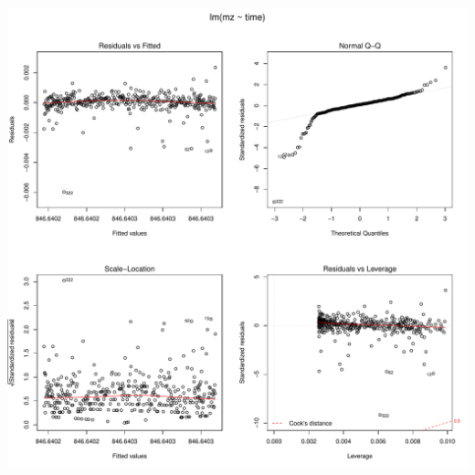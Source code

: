 \documentclass[]{article}
\begin{document}
\includegraphics{Supplementary_document_files/figure-latex/fit.lin.846-1.pdf}
\end{document}
